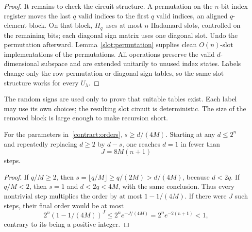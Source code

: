 \begin{proof}
It remains to check the circuit structure.  A permutation on the $n$-bit
index register moves the last $q$ valid indices to the first $q$ valid
indices, an aligned $q$-element block.  On that block, $H_q$ uses at most
$n$ Hadamard slots, controlled on
the remaining bits; each diagonal sign matrix uses one diagonal slot.  Undo
the permutation afterward.  Lemma~\ref{slot:permutation} supplies clean
$O(n)$-slot implementations of the permutations.  All operations preserve
the valid $d$-dimensional subspace and are extended unitarily to unused index
states.  Labels change only the row permutation or diagonal-sign tables,
so the same slot structure works for every $U_\lambda$.
\end{proof}

The random signs are used only to prove that suitable tables exist.
Each label may use its own choices; the resulting slot circuit is deterministic.
The size of the removed block is large enough to make recursion short.
\begin{lemma}\label{contract:depth}
For the parameters in~\eqref{contract:orders}, $s\geq d/(4M)$.
Starting at any $d\leq2^n$ and repeatedly replacing $d\geq2$ by $d-s$, one
reaches $d=1$ in fewer than
\begin{equation}\label{contract:J}
 J=8M(n+1)
\end{equation}
steps.
\end{lemma}

\begin{proof}
If $q/M\geq2$, then
$s=\lfloor q/M\rfloor\geq q/(2M)>d/(4M)$, because $d<2q$.
If $q/M<2$, then $s=1$ and $d<2q<4M$, with the same conclusion.
Thus every nontrivial step multiplies the order by at most $1-1/(4M)$.
If there were $J$ such steps, their final order would be at most
\[
 2^n(1-1/(4M))^J
 \leq2^n e^{-J/(4M)}
 =2^n e^{-2(n+1)}<1,
\]
contrary to its being a positive integer.
\end{proof}
